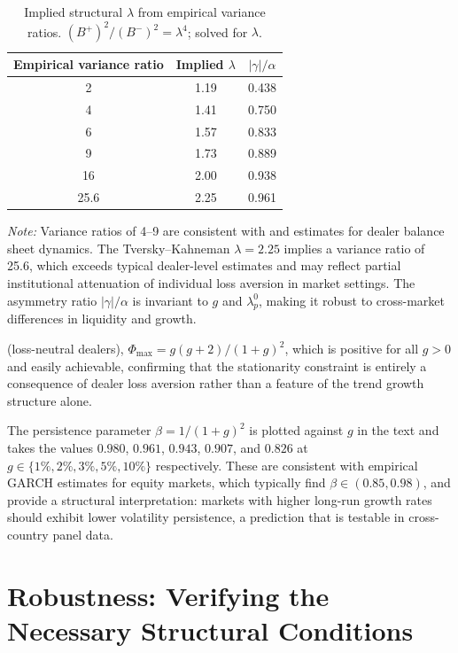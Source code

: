 \documentclass[12pt,a4paper]{article}
\theoremstyle{definition}
\begin{document}
\begin{table}[ht]
\centering
\caption{Implied structural $\lambda$ from empirical variance ratios.
$(B^+)^2/(B^-)^2 = \lambda^4$; solved for $\lambda$.}
\label{tab:lambda_implied}
\begin{tabular}{ccc}
\toprule
Empirical variance ratio & Implied $\lambda$ & $|\gamma|/\alpha$ \\
\midrule
2   & 1.19 & 0.438 \\
4   & 1.41 & 0.750 \\
6   & 1.57 & 0.833 \\
9   & 1.73 & 0.889 \\
16  & 2.00 & 0.938 \\
25.6 & 2.25 & 0.961 \\
\bottomrule
\end{tabular}
\medskip

\noindent\footnotesize{\textit{Note:} Variance ratios of 4--9 are consistent
with \citet{adrian2010} and \citet{brunnermeier2009} estimates for dealer
balance sheet dynamics. The Tversky--Kahneman $\lambda = 2.25$ implies a
variance ratio of 25.6, which exceeds typical dealer-level estimates and may
reflect partial institutional attenuation of individual loss aversion in
market settings. The asymmetry ratio $|\gamma|/\alpha$ is invariant to $g$
and $\lambda^0_p$, making it robust to cross-market differences in liquidity
and growth.}
\end{table}
(loss-neutral dealers), $\Phi_{\max} = g(g+2)/(1+g)^2$, which is positive
for all $g > 0$ and easily achievable, confirming that the stationarity
constraint is entirely a consequence of dealer loss aversion rather than a
feature of the trend growth structure alone.

The persistence parameter $\beta = 1/(1+g)^2$ is plotted against $g$ in
the text and takes the values $0.980$, $0.961$, $0.943$, $0.907$, and
$0.826$ at $g \in \{1\%, 2\%, 3\%, 5\%, 10\%\}$ respectively. These are
consistent with empirical GARCH estimates for equity markets, which
typically find $\beta \in (0.85, 0.98)$, and provide a structural
interpretation: markets with higher long-run growth rates should exhibit
lower volatility persistence, a prediction that is testable in cross-country
panel data.


\section{Robustness: Verifying the Necessary Structural Conditions}
\label{sec:robustness}
\end{document}
